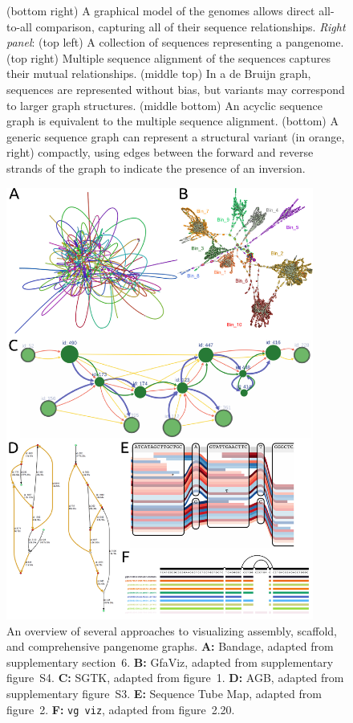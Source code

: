 \begin{figure}[p]
{    (bottom right) A graphical model of the genomes allows direct all-to-all comparison, capturing all of their sequence relationships.
    \emph{Right panel}:
    (top left) A collection of sequences representing a pangenome.
    (top right) Multiple sequence alignment of the sequences captures their mutual relationships.
    (middle top) In a de Bruijn graph, sequences are represented without bias, but variants may correspond to larger graph structures.
    (middle bottom) An acyclic sequence graph is equivalent to the multiple sequence alignment.
    (bottom) A generic sequence graph can represent a structural variant (in orange, right) compactly, using edges between the forward and reverse strands of the graph to indicate the presence of an inversion.
  }
\end{figure}

\begin{figure}[p]
    \includegraphics[width=0.9\textwidth]{figures/visualization.pdf}
    \caption{\label{fig:visualization} An overview of several approaches to visualizing assembly, scaffold, and comprehensive pangenome graphs.
\textbf{A:} Bandage, adapted from \cite{Wick_2015} supplementary section~6.
\textbf{B:} GfaViz, adapted from \cite{Gonnella_2018} supplementary figure~S4.
\textbf{C:} SGTK, adapted from \cite{Kunyavskaya_2018} figure~1.
\textbf{D:} AGB, adapted from \cite{Mikheenko_2019} supplementary figure~S3.
\textbf{E:} Sequence Tube Map, adapted from \cite{Beyer_2019} figure~2.
\textbf{F:} \texttt{vg viz}, adapted from \cite{Garrison_2019} figure~2.20.}
\end{figure}
